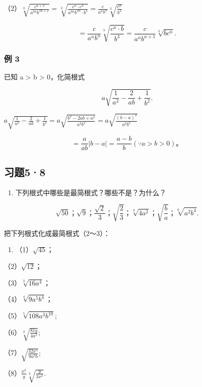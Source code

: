 （2）\(\sqrt[3]{\frac{c^{n+3}}{a^{3n}b^{3n+2}}} = \sqrt[3]{\frac{c^n \cdot c^3}{a^{3n}b^{3n} \cdot b^2}} = \frac{c}{a^n b^n} \sqrt[3]{\frac{c^n}{b^2}}\)

\[
= \frac{c}{a^n b^n} \sqrt[3]{\frac{c^n \cdot b}{b^3}} = \frac{c}{a^n b^{n+1}} \sqrt[3]{bc^n}.
\]

\subsubsection{例 3}

已知 a \textgreater{} b \textgreater{} 0，化简根式

\[
a \sqrt {\frac{1}{a ^ {2}} - \frac{2}{a b} + \frac{1}{b ^ {2}}}.
\]

\(a\sqrt{\frac{1}{a^2} - \frac{2}{ab} + \frac{1}{b^2}} = a\sqrt{\frac{b^2 - 2ab + a^2}{a^2b^2}} = a\sqrt{\frac{(b - a)^2}{a^2b^2}}\)

\[
= \frac{a}{a b} | b - a | = \frac{a - b}{b} (\because a > b > 0)\text{。}
\]

\subsection{习题5·8}

\begin{enumerate}
\item
  下列根式中哪些是最简根式？哪些不是？为什么？
\end{enumerate}

\[
\sqrt {50}\text{；} \sqrt {9}\text{；} \frac{\sqrt {2}}{3}\text{；} \sqrt {\frac{2}{3}}\text{；} \sqrt[3]{4 a ^ {2}}\text{；} \sqrt {\frac{b}{a}}\text{；} \sqrt[6]{a ^ {2} b ^ {4}}.
\]

把下列根式化成最简根式（2～3）：

\begin{enumerate}[start=2]
\item
  （1）\(\sqrt{45}\)；
\end{enumerate}

（2）\(\sqrt{12}\)；

（3）\(\sqrt[3]{16a^4}\)；

（4）\(\sqrt[4]{9a^5b^4}\)；

（5）\(\sqrt[5]{108a^{3}b^{10}};\)

（6）\(\sqrt[3]{\frac{81y}{4a^2}};\)

（7）\(\sqrt{\frac{32x^5}{9a^3b}};\)

（8）\(\frac{x^2}{y} \sqrt[3]{\frac{y}{3x^2}}.\)


